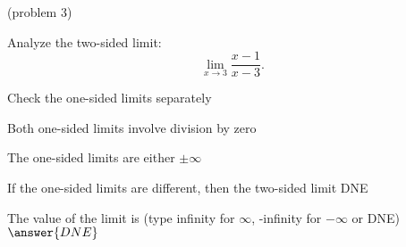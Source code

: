 \documentclass[handout]{ximera}
\begin{document}
\begin{problem}(problem 3)
  
	Analyze the two-sided limit:
  \[
  \lim_{x \to 3} \frac{x-1}{x-3}.
  \]
  
    \begin{hint}
      Check the one-sided limits separately
    \end{hint}
    \begin{hint}
      Both one-sided limits involve division by zero
    \end{hint}
    \begin{hint}
      The one-sided limits are either $\pm \infty$
    \end{hint}
		\begin{hint}
		  If the one-sided limits are different, then the two-sided limit DNE
		\end{hint}	
		The value of the limit is
		(type infinity for $\infty$, -infinity for $-\infty$ or DNE)
		 $\answer{DNE}$
		
\end{problem}
\end{document}
